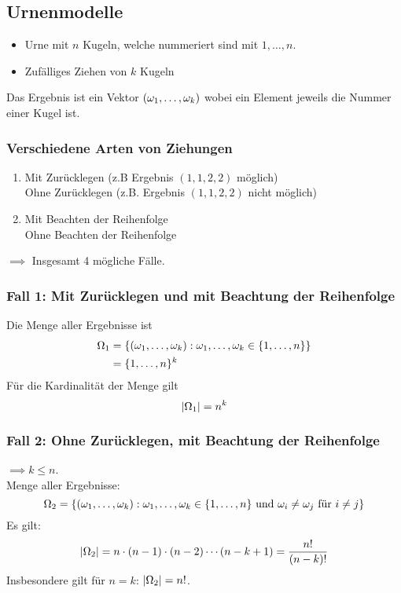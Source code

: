 \subsection{Urnenmodelle}
\begin{itemize}
    \item Urne mit $n$ Kugeln, welche nummeriert sind mit $1, \dots , n$.
    \item Zufälliges Ziehen von $k$ Kugeln
\end{itemize}
Das Ergebnis ist ein Vektor $(\omega_1,\dots , \omega_k)$ wobei ein Element jeweils die
Nummer einer Kugel ist.

\subsubsection{Verschiedene Arten von Ziehungen}
\begin{enumerate}
    \item Mit Zurücklegen (z.B Ergebnis $(1,1,2,2)$ möglich) \\
          Ohne Zurücklegen (z.B. Ergebnis $(1,1,2,2)$ nicht möglich)
    \item Mit Beachten der Reihenfolge\\
          Ohne Beachten der Reihenfolge
\end{enumerate}
$\implies$ Insgesamt 4 mögliche Fälle.

\subsubsection{Fall 1: Mit Zurücklegen und mit Beachtung der Reihenfolge}
Die Menge aller Ergebnisse ist
\begin{align*}
    \Omega_1 & = \{ (\omega_1, \dots ,\omega_k): \omega_1, \dots ,\omega_k \in \{1,\dots ,n\} \}\\
          & =\{ 1,\dots ,n \}^k
\end{align*}
Für die Kardinalität der Menge gilt
\begin{equation*}
    |\Omega_1| = n^k
\end{equation*}

\subsubsection{Fall 2: Ohne Zurücklegen, mit Beachtung der Reihenfolge}
$\implies k \leq n$.\\
Menge aller Ergebnisse:
\begin{equation*}
    \Omega_2 = \{ (\omega_1, \dots ,\omega_k): \omega_1, \dots ,\omega_k \in \{ 1, \dots ,n \} \text{ und } \omega_i \neq \omega_j \text{ für } i \neq j \}
\end{equation*}
Es gilt:
\begin{equation*}
    |\Omega_2| = n \cdot (n-1) \cdot (n-2) \cdots (n-k+1) = \frac{n!}{(n-k)!}
\end{equation*}
Insbesondere gilt für $n=k$: $|\Omega_2| = n!$.

